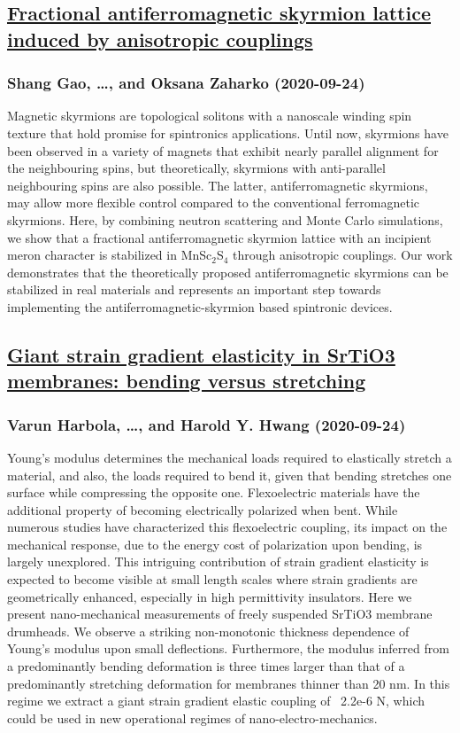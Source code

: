 \subsection*{\href{http://arxiv.org/abs/2009.11432v1}{Fractional antiferromagnetic skyrmion lattice induced by anisotropic  couplings}}
\subsubsection*{Shang Gao, \dots, and Oksana Zaharko (2020-09-24)}
Magnetic skyrmions are topological solitons with a nanoscale winding spin
texture that hold promise for spintronics applications. Until now, skyrmions
have been observed in a variety of magnets that exhibit nearly parallel
alignment for the neighbouring spins, but theoretically, skyrmions with
anti-parallel neighbouring spins are also possible. The latter,
antiferromagnetic skyrmions, may allow more flexible control compared to the
conventional ferromagnetic skyrmions. Here, by combining neutron scattering and
Monte Carlo simulations, we show that a fractional antiferromagnetic skyrmion
lattice with an incipient meron character is stabilized in MnSc$_2$S$_4$
through anisotropic couplings. Our work demonstrates that the theoretically
proposed antiferromagnetic skyrmions can be stabilized in real materials and
represents an important step towards implementing the
antiferromagnetic-skyrmion based spintronic devices.

\subsection*{\href{http://arxiv.org/abs/2009.11427v1}{Giant strain gradient elasticity in SrTiO3 membranes: bending versus  stretching}}
\subsubsection*{Varun Harbola, \dots, and Harold Y. Hwang (2020-09-24)}
Young's modulus determines the mechanical loads required to elastically
stretch a material, and also, the loads required to bend it, given that bending
stretches one surface while compressing the opposite one. Flexoelectric
materials have the additional property of becoming electrically polarized when
bent. While numerous studies have characterized this flexoelectric coupling,
its impact on the mechanical response, due to the energy cost of polarization
upon bending, is largely unexplored. This intriguing contribution of strain
gradient elasticity is expected to become visible at small length scales where
strain gradients are geometrically enhanced, especially in high permittivity
insulators. Here we present nano-mechanical measurements of freely suspended
SrTiO3 membrane drumheads. We observe a striking non-monotonic thickness
dependence of Young's modulus upon small deflections. Furthermore, the modulus
inferred from a predominantly bending deformation is three times larger than
that of a predominantly stretching deformation for membranes thinner than 20
nm. In this regime we extract a giant strain gradient elastic coupling of
~2.2e-6 N, which could be used in new operational regimes of
nano-electro-mechanics.

